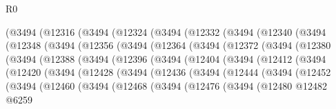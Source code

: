 \begin{lexlean}{R0}
\begin{coremodule}
      (@3494
        (@12316
          (@3494
            (@12324
              (@3494
                (@12332
                  (@3494
                    (@12340
                      (@3494
                        (@12348
                          (@3494
                            (@12356
                              (@3494
                                (@12364
                                  (@3494
                                    (@12372
                                      (@3494
                                        (@12380
                                          (@3494
                                            (@12388
                                              (@3494
                                                (@12396
                                                  (@3494
                                                    (@12404
                                                      (@3494
                                                        (@12412
                                                          (@3494
                                                            (@12420
                                                              (@3494
                                                                (@12428
                                                                  (@3494
                                                                    (@12436
                                                                      (@3494
                                                                        (@12444
                                                                          (@3494
                                                                            (@12452
                                                                              (@3494
                                                                                (@12460
                                                                                  (@3494
                                                                                    (@12468
                                                                                      (@3494
                                                                                        (@12476
                                                                                          (@3494
                                                                                            (@12480
                                                                                              @12482
                                                                                              @6259

\end{coremodule}
\end{lexlean}

